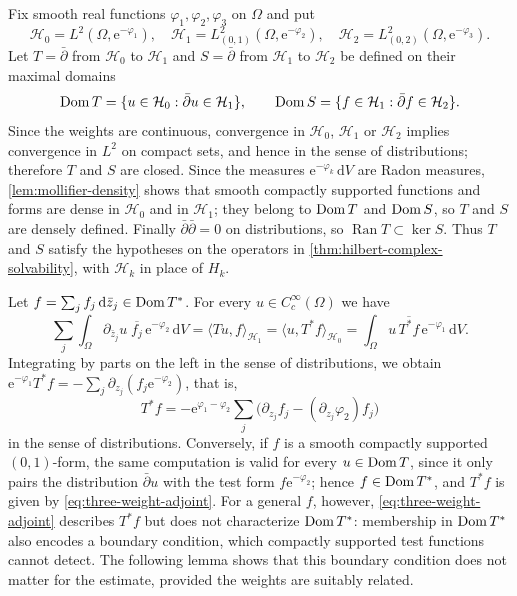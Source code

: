 Fix smooth real functions $\varphi_1,\varphi_2,\varphi_3$ on $\Omega$ and put
\[
 \mathcal H_0=L^2(\Omega,\mathrm e^{-\varphi_1}),\quad
 \mathcal H_1=L^2_{(0,1)}(\Omega,\mathrm e^{-\varphi_2}),\quad
 \mathcal H_2=L^2_{(0,2)}(\Omega,\mathrm e^{-\varphi_3}).
\]
Let $T=\bar\partial$ from $\mathcal H_0$ to $\mathcal H_1$ and $S=\bar\partial$ from $\mathcal H_1$ to $\mathcal H_2$ be defined on their maximal domains
\[
 \operatorname{Dom} T=\{u\in \mathcal H_0:\bar\partial u\in \mathcal H_1\},\qquad \operatorname{Dom} S=\{f\in \mathcal H_1:\bar\partial f\in \mathcal H_2\}.
\]
Since the weights are continuous, convergence in $\mathcal H_0$, $\mathcal H_1$ or $\mathcal H_2$ implies convergence in $L^2$ on compact sets, and hence in the sense of distributions; therefore $T$ and $S$ are closed. Since the measures $\mathrm e^{-\varphi_k}\,\mathrm dV$ are Radon measures, \cref{lem:mollifier-density} shows that smooth compactly supported functions and forms are dense in $\mathcal H_0$ and in $\mathcal H_1$; they belong to $\operatorname{Dom} T$ and $\operatorname{Dom} S$, so $T$ and $S$ are densely defined. Finally $\bar\partial\bar\partial=0$ on distributions, so $\operatorname{Ran}T\subset\ker S$. Thus $T$ and $S$ satisfy the hypotheses on the operators in \cref{thm:hilbert-complex-solvability}, with $\mathcal H_k$ in place of $H_k$.

Let $f=\sum_jf_j\,\mathrm d\bar z_j\in\operatorname{Dom} T^*$. For every $u\in C^\infty_c(\Omega)$ we have
\[
 \sum_j\int_\Omega\partial_{\bar z_j}u\;\overline{f_j}\,\mathrm e^{-\varphi_2}\,\mathrm dV=\langle Tu,f\rangle_{\mathcal H_1}=\langle u,T^*f\rangle_{\mathcal H_0}=\int_\Omega u\,\overline{T^*f}\,\mathrm e^{-\varphi_1}\,\mathrm dV.
\]
Integrating by parts on the left in the sense of distributions, we obtain $\mathrm e^{-\varphi_1}T^*f=-\sum_j\partial_{z_j}(f_j\mathrm e^{-\varphi_2})$, that is,
\begin{equation}\label{eq:three-weight-adjoint}
 T^*f=-\mathrm e^{\varphi_1-\varphi_2}
       \sum_j\bigl(\partial_{z_j}f_j-(\partial_{z_j}\varphi_2)f_j\bigr)
\end{equation}
in the sense of distributions. Conversely, if $f$ is a smooth compactly supported $(0,1)$-form, the same computation is valid for every $u\in\operatorname{Dom} T$, since it only pairs the distribution $\bar\partial u$ with the test form $f\mathrm e^{-\varphi_2}$; hence $f\in\operatorname{Dom} T^*$, and $T^*f$ is given by \eqref{eq:three-weight-adjoint}. For a general $f$, however, \eqref{eq:three-weight-adjoint} describes $T^*f$ but does not characterize $\operatorname{Dom} T^*$: membership in $\operatorname{Dom} T^*$ also encodes a boundary condition, which compactly supported test functions cannot detect. The following lemma shows that this boundary condition does not matter for the estimate, provided the weights are suitably related.

